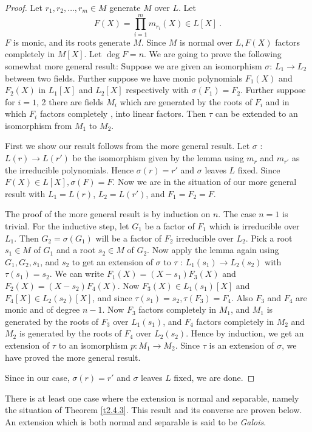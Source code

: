 \begin{proof}
Let $r_{1},r_{2},\ldots,r_{m}\in M$ generate $M$ over $L$. Let
$$
F(X)=\prod_{i=1}^{m}m_{r_{i}}(X)\in L[X]\ .
$$
$F$ is monic, and its roots generate $M$. Since $M$ is normal over $L,F(X)$ factors completely in $M[X]$. Let $\deg F=n$. We are going to prove the following somewhat more general result: Suppose we are given an isomorphism $\sigma$: $L_{1}\rightarrow L_{2}$ between two fields. Further suppose we have monic polynomials $F_{1}(X)$ and $F_{2}(X)$ in $L_{1}[X]$ and $L_{2}[X]$ respectively with $\sigma(F_{1})=F_{2}$. Further suppose for $i=1$, 2 there are fields $M_{i}$ which are generated by the roots of $F_{i}$ and in which $F_{i}$ factors completely \ie, into linear factors. Then $\tau$ can be extended to an isomorphism from $M_{1}$ to $M_{2}$.

First we show our result follows from the more general result. Let $\sigma$ : $L(r)\rightarrow L(r')$ be the isomorphism given by the lemma using $m_{r}$ and $m_{r'}$ as the irreducible polynomials. Hence $\sigma(r)=r'$ and $\sigma$ leaves $L$ fixed. Since $F(X)\in L[X], \sigma(F)=F$. Now we are in the situation of our more general result with $L_{1}=L(r)$, $L_{2}=L(r')$, and $F_{1}=F_{2}=F$.

The proof of the more general result is by induction on $n$. The case $n=1$ is trivial. For the inductive step, let $G_{1}$ be a factor of $F_{1}$ which is irreducible over $L_{1}$. Then $G_{2}=\sigma(G_{1})$ will be a factor of $F_{2}$ irreducible over $L_{2}$. Pick a root $s_{1}\in M$ of $G_{1}$ and a root $s_{2}\in M$ of $G_{2}$. Now apply the lemma again using $G_{1},G_{2},s_{1}$, and $s_{2}$ to get an extension of $\sigma$ to $\tau$ : $L_{1}(s_{1})\rightarrow L_{2}(s_{2})$ with $\tau(s_{1})= s_{2}$. We can write $F_{1}(X)=(X-s_{1})F_{3}(X)$ and $F_{2}(X)=(X-s_{2})F_{4}(X)$. Now $F_{3}(X)\in L_{1}(s_{1})[X]$ and $F_{4}[X]\in L_{2}(s_{2})[X]$, and since $\tau(s_{1})=s_{2},\tau(F_{3})=F_{4}$. Also $F_{3}$ and $F_{4}$ are monic and of degree $n-1$. Now $F_{3}$ factors completely in $M_{1}$, and $M_{1}$ is generated by the roots of $F_{3}$ over $L_{1}(s_{1})$, and $F_{4}$ factors completely in $M_{2}$ and $M_{2}$ is generated by the roots of $F_{4}$ over $L_{2}(s_{2})$. Hence by induction, we get an extension of $\tau$ to an isomorphism $p:M_{1}\rightarrow M_{2}$. Since $\tau$ is an extension of $\sigma$, we have proved the more general result.

Since in our case, $\sigma(r)=r'$ and $\sigma$ leaves $L$ fixed, we are done.
\end{proof}
There is at least one case where the extension is normal and separable, namely the situation of Theorem \ref{t2.4.3}. This result and its converse are proven below. An extension which is both normal and separable is said to be {\it Galois}.

